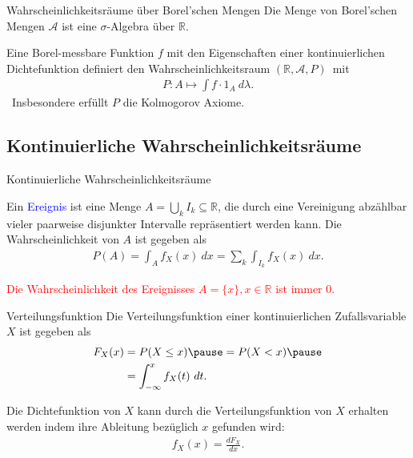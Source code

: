 \documentclass{beamer}
\def\padding{\vspace{0.5cm}}
\def\spadding{\vspace{0.25cm}}
\def\b{\textcolor{blue}}
\def\r{\textcolor{red}}
\begin{document}
\begin{frame}
    \begin{block}{Wahrscheinlichkeitsräume über Borel'schen Mengen}
        Die Menge von Borel'schen Mengen $\mathcal{A}$ ist eine $\sigma$-Algebra über $\mathbb{R}$.\pause\par\spadding
        Eine Borel-messbare Funktion $f$ mit den Eigenschaften einer kontinuierlichen Dichtefunktion definiert den Wahrscheinlichkeitsraum $(\mathbb{R}, \mathcal{A}, P)$\pause\ mit \begin{align*}
            P : A \mapsto \int f \cdot 1_A\ d\lambda.
        \end{align*}\pause\ Insbesondere erfüllt $P$ die Kolmogorov Axiome.
    \end{block}
\end{frame}

\subsection{Kontinuierliche Wahrscheinlichkeitsräume}
\begin{frame}{Kontinuierliche Wahrscheinlichkeitsräume}
    \begin{definition}
        Ein \b{Ereignis} ist eine Menge $A = \bigcup_k I_k \subseteq \mathbb{R}$, die durch eine Vereinigung abzählbar vieler paarweise disjunkter Intervalle repräsentiert werden kann. Die Wahrscheinlichkeit von $A$ ist gegeben als
        \begin{align*}
            P(A) = \int_A f_X(x)\ dx = \sum_k \int_{I_k} f_X(x)\ dx.
        \end{align*}
    \end{definition}\pause\par\padding
    \r{Die Wahrscheinlichkeit des Ereignisses $A = \{x\}, x \in \mathbb{R}$ ist immer $0$.}
\end{frame}

\begin{frame}
    \begin{block}{Verteilungsfunktion}
        Die Verteilungsfunktion einer kontinuierlichen Zufallsvariable $X$ ist gegeben als
        \begin{align*}
            F_X(x) &= P(X \leq x)\pause = P(X < x)\pause \\
                   &= \int_{- \infty}^x f_X(t)\ dt.
        \end{align*}\pause\par\spadding
        Die Dichtefunktion von $X$ kann durch die Verteilungsfunktion von $X$ erhalten werden indem ihre Ableitung bezüglich $x$ gefunden wird:
        \begin{align*}
            f_X(x) = \frac{dF_X}{dx}.
        \end{align*}
    \end{block}
\end{frame}
\end{document}
